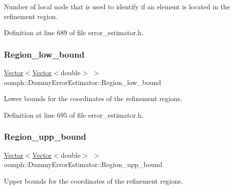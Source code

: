 Number of local node that is used to identify if an element is located in the refinement region. 



Definition at line 689 of file error\+\_\+estimator.\+h.

\mbox{\label{classoomph_1_1DummyErrorEstimator_a181a66a833352440c325a8edbefb51cf}} 
\subsubsection{\texorpdfstring{Region\+\_\+low\+\_\+bound}{Region\_low\_bound}}
{\footnotesize\ttfamily \hyperlink{classoomph_1_1Vector}{Vector}$<$\hyperlink{classoomph_1_1Vector}{Vector}$<$double$>$ $>$ oomph\+::\+Dummy\+Error\+Estimator\+::\+Region\+\_\+low\+\_\+bound\hspace{0.3cm}{\ttfamily [private]}}



Lower bounds for the coordinates of the refinement regions. 



Definition at line 695 of file error\+\_\+estimator.\+h.

\mbox{\label{classoomph_1_1DummyErrorEstimator_a80f495a70922a1e458899e2e7313620d}} 
\subsubsection{\texorpdfstring{Region\+\_\+upp\+\_\+bound}{Region\_upp\_bound}}
{\footnotesize\ttfamily \hyperlink{classoomph_1_1Vector}{Vector}$<$\hyperlink{classoomph_1_1Vector}{Vector}$<$double$>$ $>$ oomph\+::\+Dummy\+Error\+Estimator\+::\+Region\+\_\+upp\+\_\+bound\hspace{0.3cm}{\ttfamily [private]}}



Upper bounds for the coordinates of the refinement regions. 



